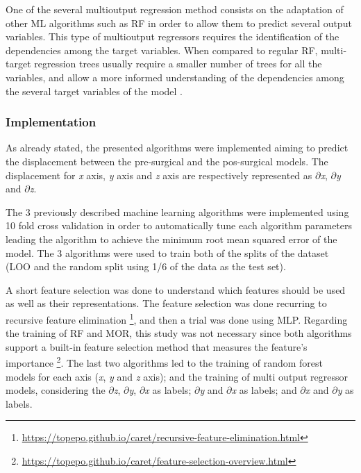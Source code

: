 \begin{itemize}
One of the several multioutput regression method consists on the adaptation of other ML algorithms such as RF in order to allow them to predict several output variables. This type of multioutput regressors requires the identification of the dependencies among the target variables. When compared to regular RF, multi-target regression trees usually require a smaller number of trees for all the variables, and allow a more informed understanding of the dependencies among the several target variables of the model \cite{Borchani}.


\end{itemize}


\subsubsection{Implementation}

As already stated, the presented algorithms were implemented aiming to predict the displacement between the pre-surgical and the pos-surgical models. The displacement for \textit{x} axis, \textit{y} axis and \textit{z} axis are respectively represented as \textit{$\partial$x}, \textit{$\partial$y} and \textit{$\partial$z}.

The 3 previously described machine learning algorithms were implemented using 10 fold cross validation in order to automatically tune each algorithm parameters leading the algorithm to achieve the minimum root mean squared error of the model. The 3 algorithms were used to train both of the splits of the dataset (LOO and the random split using 1/6 of the data as the test set).

A short feature selection was done to understand which features should be used as well as their representations. The feature selection was done recurring to recursive feature elimination \footnote{\url{https://topepo.github.io/caret/recursive-feature-elimination.html}}, and then a trial was done using MLP. Regarding the training of RF and MOR, this study was not necessary since both algorithms support a built-in feature selection method that measures the feature's importance \footnote{\url{https://topepo.github.io/caret/feature-selection-overview.html}}. The last two algorithms led to the training of random forest models for each axis (\textit{x}, \textit{y} and \textit{z} axis); and the training of multi output regressor models, considering the \textit{$\partial$z}, \textit{$\partial$y}, \textit{$\partial$x} as labels; \textit{$\partial$y} and \textit{$\partial$x} as labels; and \textit{$\partial$x} and \textit{$\partial$y} as labels.

